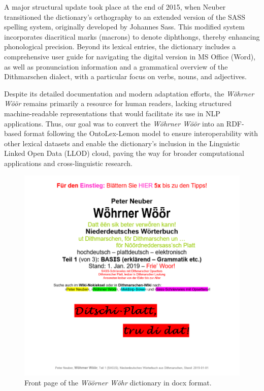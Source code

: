 \documentclass[11pt]{article}
\begin{document}
A major structural update took place at the end of 2015, when Neuber transitioned the dictionary's orthography to an extended version of the SASS spelling system, originally developed by Johannes Sass. This modified system incorporates diacritical marks (macrons) to denote diphthongs, thereby enhancing phonological precision. Beyond its lexical entries, the dictionary includes a comprehensive user guide for navigating the digital version in MS Office (Word), as well as pronunciation information and a grammatical overview of the Dithmarschen dialect, with a particular focus on verbs, nouns, and adjectives.

Despite its detailed documentation and modern adaptation efforts, the \emph{Wöhrner Wöör} remains primarily a resource for human readers, lacking structured machine-readable representations that would facilitate its use in NLP applications. Thus, our goal was to convert the \emph{Wöhrner Wöör} into an RDF-based format following the OntoLex-Lemon model to ensure interoperability with other lexical datasets and enable the dictionary’s inclusion in the Linguistic Linked Open Data (LLOD) cloud, paving the way for broader computational applications and cross-linguistic research.

\begin{figure}
    \centering
    \includegraphics[width=1\linewidth]{img/woewoe_cover.png}
    \caption{Front page of the \emph{Wöörner Wöhr} dictionary in docx format.}
    \label{fig:enter-label}
\end{figure}
\end{document}

